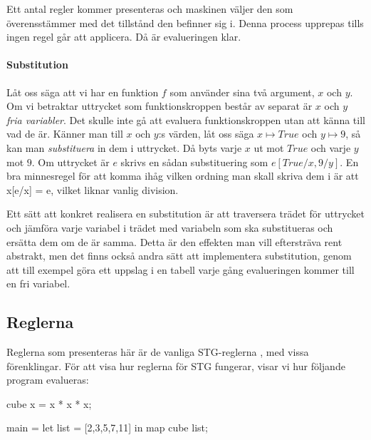 \documentclass[../Core]{subfiles}
\begin{document}

Ett antal regler kommer presenteras och maskinen väljer den som överensstämmer
med det tillstånd den befinner sig i. Denna process upprepas
tills ingen regel går att applicera. Då är evalueringen klar.

\paragraph{Substitution}

Låt oss säga att vi har en funktion $f$ som använder sina två 
argument, $x$ och $y$. Om vi betraktar uttrycket som funktionskroppen består av separat är $x$ och $y$ 
\emph{fria variabler}. Det skulle inte gå att evaluera funktionskroppen utan
att känna till vad de är. Känner man till $x$ och $y$:s värden, låt oss säga
$x \mapsto True$ och $y \mapsto 9$, så kan man \emph{substituera} in dem i 
uttrycket. Då byts varje $x$ ut mot $True$ och varje $y$ mot $9$. Om uttrycket 
är $e$ skrivs en sådan substituering som $e[True/x, 9/y]$. 
  En bra minnesregel för att komma ihåg vilken ordning man skall 
  skriva dem i är att x[e/x] = e, vilket liknar vanlig division.

    Ett sätt att konkret realisera en substitution är att traversera trädet
för uttrycket och jämföra varje variabel i trädet med variabeln som ska 
substitueras och ersätta dem om de är samma. Detta är den effekten man vill 
eftersträva rent abstrakt, men det finns också andra sätt att implementera 
substitution, genom att till exempel göra ett uppslag i en tabell varje gång 
evalueringen kommer till en fri variabel. 

\subsection{Reglerna}

Reglerna som presenteras här är de vanliga STG-reglerna \cite{marlow2006making},
med vissa förenklingar.
För att visa hur reglerna
för STG  fungerar, visar vi hur följande program evalueras:

\begin{codeEx}
cube x = x * x * x;

main = let list = [2,3,5,7,11]
       in  map cube list;
\end{codeEx}
\end{document}
